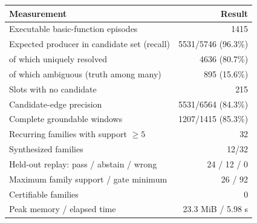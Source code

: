 \begin{tabular}{lr}
\toprule
Measurement & Result \\
\midrule
Executable basic-function episodes & 1415 \\
Expected producer in candidate set (recall) & 5531/5746 (96.3\%) \\
\quad of which uniquely resolved & 4636 (80.7\%) \\
\quad of which ambiguous (truth among many) & 895 (15.6\%) \\
Slots with no candidate & 215 \\
Candidate-edge precision & 5531/6564 (84.3\%) \\
Complete groundable windows & 1207/1415 (85.3\%) \\
Recurring families with support $\geq 5$ & 32 \\
Synthesized families & 12/32 \\
Held-out replay: pass / abstain / wrong & 24 / 12 / 0 \\
Maximum family support / gate minimum & 26 / 92 \\
Certifiable families & 0 \\
Peak memory / elapsed time & 23.3 MiB / 5.98 s \\
\bottomrule
\end{tabular}

